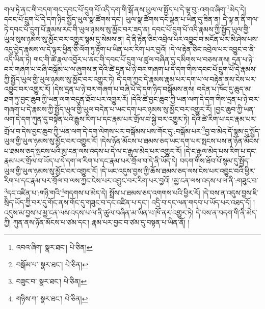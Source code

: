 གལ་ཏེ་ནང་གི་བདག་གང་དབང་པོ་དྲུག་པོ་འདི་དག་གི་སྒོ་ནས་ཡུལ་ལ་སྤྱོད་པ་དེ་ལྟ་བུ་:འགའ་ཞིག་\footnote{འབའ་ཞིག་  སྣར་ཐང་།  པེ་ཅིན། }མེད་དེ། དབང་པོ་དྲུག་པོ་དེ་དག་ཉིད་སྤྱོད་ཡུལ་སྣ་ཚོགས་དང་། ཡུལ་སྣ་ཚོགས་དང་ལྡན་པ་ཡིན་དུ་ཟིན་ན། དེ་ལྟ་ན་ནི་གལ་ཏེ་དབང་པོ་དྲུག་པོ་རྣམས་རང་གི་ཡུལ་ཉམས་སུ་མྱོང་བར་ཟད་ན། དབང་པོ་དྲུག་པོ་འདི་རྣམས་ཀྱི་སྤྱོད་ཡུལ་གྱི་ཡུལ་སུས་ཉམས་སུ་མྱོང་བར་འགྱུར་སྙམ་དུ་སེམས་ན། དེ་ནི་རྟེན་ཅིང་འབྲེལ་པར་འབྱུང་བ་མངོན་པར་མི་ཤེས་པས་འདུ་བྱེད་རྣམས་ལ་དེ་ལྟར་ཕྱིན་ཅི་ལོག་ཏུ་རྟོག་པ་ཡིན་པར་རིག་པར་བྱའོ། །དེ་ལ་རྟེན་ཅིང་འབྲེལ་པར་འབྱུང་བ་ནི་འདི་ཡིན་ཏེ། གང་གི་ཚེ་རྣལ་འབྱོར་པ་ནང་གི་དབང་པོ་དྲུག་ལ་ཚུལ་བཞིན་དུ་དམིགས་པ་བཅས་ནས། དྲན་པ་ཉེ་བར་གཞག་པ་བཞི་བསྒོམ་པ་ལ་ཞུགས་ན་དེའི་ཚེ་དྲན་པ་ཉེ་བར་གཞག་པ་དེ་དག་གིས་དབང་པོ་དྲུག་པོ་དེ་རྣམས་ཀྱི་སྤྱོད་ཡུལ་གྱི་ཡུལ་ཉམས་སུ་མྱོང་བར་འགྱུར་ཏེ། དེ་དག་ཀྱང་དེ་རྣམས་རྣམ་པར་དག་པ་ལ་བརྟེན་ནས་ངེས་པར་འབྱུང་བར་འགྱུར་རོ། །དེས་དྲན་པ་ཉེ་བར་གཞག་པ་བཞི་པོ་དེ་དག་ཉིད་བསྒོམས་ནས། བདེན་པ་ཁོང་དུ་ཆུད་མ་ཐག་ཏུ་བྱང་ཆུབ་ཀྱི་ཡན་ལག་བདུན་ཐོབ་པར་འགྱུར་རོ། །དེའི་ཚེ་བྱང་ཆུབ་ཀྱི་ཡན་ལག་དེ་དག་གིས་དྲན་པ་ཉེ་བར་གཞག་པ་དེ་རྣམས་ཀྱི་སྤྱོད་ཡུལ་གྱི་ཡུལ་བདེན་པ་ཡང་དག་པར་ཉམས་སུ་མྱོང་བར་འགྱུར་རོ། །བྱང་ཆུབ་ཀྱི་ཡན་ལག་དེ་དག་ཀུན་དུ་བསྟེན་པའི་རྒྱུས་རིག་པ་དང་རྣམ་པར་གྲོལ་བ་སྐྱེ་བར་འགྱུར་ཏེ། དེའི་ཚེ་རིག་པ་དང་རྣམ་པར་གྲོལ་བ་དེས་བྱང་ཆུབ་ཀྱི་ཡན་ལག་དེ་དག་ལེགས་པར་བསྒོམས་པས་གོང་དུ་:བསྒོམ་པར་\footnote{བསྒོམ་པ་  སྣར་ཐང་།  པེ་ཅིན། }བྱ་བ་མེད་དོ་སྙམ་དུ་སྤྱོད་ཡུལ་གྱི་ཡུལ་ཉམས་སུ་མྱོང་བར་འགྱུར་རོ། །དེས་ཉོན་མོངས་པ་ཐམས་ཅད་ཡང་དག་པར་སྤངས་པས་ན་ཉོན་མོངས་པ་ཐམས་ཅད་སྤངས་པའི་མྱ་ངན་ལས་འདས་པ་དེ་ལ་ང་རྒྱལ་མེད་པར་འགྱུར་རོ། །དེ་ང་རྒྱལ་མེད་པས་རིག་པ་དང་རྣམ་པར་གྲོལ་བ་ཡོད་པ་དེ་དག་ལ་རིག་པ་དང་རྣམ་པར་གྲོལ་བ་དེ་ནི་ཡོད་དེ། བདག་གིས་ཐོབ་པོ་སྙམ་དུ་སྤྱོད་ཡུལ་གྱི་ཡུལ་ཉམས་སུ་མྱོང་བར་འགྱུར་རོ། །དེ་ཡང་འདུས་བྱས་ཀྱི་ཆོས་ཐམས་ཅད་ལས་ངེས་པར་འབྱུང་བའི་ཕྱིར་རིག་པ་དང་རྣམ་པར་གྲོལ་བ་ལས་ཀྱང་ངེས་པར་འབྱུང་བར་རིག་པར་བྱའོ། །མྱ་ངན་ལས་འདས་པ་ལ་ནི་:གཟུང་བ་\footnote{བཟུང་བ་  སྣར་ཐང་།  པེ་ཅིན། }དང་འཛིན་པ་:གཉི་གའི་\footnote{གཉིས་ཀ་  སྣར་ཐང་།  པེ་ཅིན། }གདགས་པ་མེད་དེ། སྤྲོས་པ་ཐམས་ཅད་འགགས་པའི་ཕྱིར་རོ། །དེ་བས་ན་འདུས་བྱས་ཇི་སྲིད་ཡོད་ཀྱི་བར་དུ་གོང་ནས་གོང་དུ་གཟུང་བ་དང་འཛིན་པ་དང་། འདྲི་བ་དང་ལན་གདབ་པ་ཡོད་པར་འཐད་དོ། །འདུས་མ་བྱས་པ་མྱ་ངན་ལས་འདས་པ་ལ་ནི་ཚུལ་བཞིན་མ་ཡིན་པ་ཁོ་ནར་འགྱུར་ཏེ། དེ་བས་ན་བདག་གི་ནི་མེད་ཀྱི། ཀུན་ནས་ཉོན་མོངས་པ་ཙམ་དང་། རྣམ་པར་བྱང་བ་ཙམ་དུ་བསྟན་པ་ཡིན་ནོ། །
